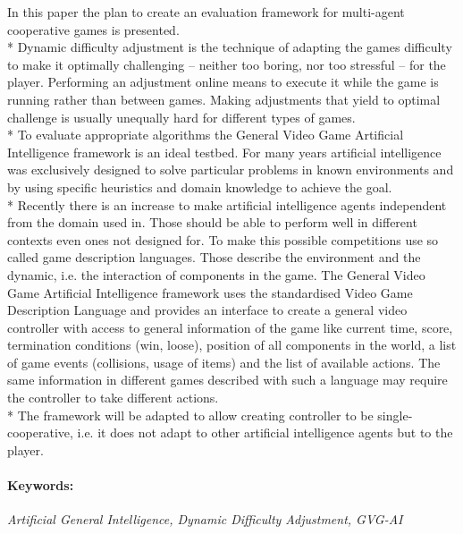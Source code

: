 In this paper the plan to create an evaluation framework for multi-agent cooperative games is presented.\\*
Dynamic difficulty adjustment is the technique of adapting the games difficulty to make it optimally challenging -- neither too boring, nor too stressful -- for the player. Performing an adjustment online means to execute it while the game is running rather than between games. Making adjustments that yield to optimal challenge is usually unequally hard for different types of games.\\*
To evaluate appropriate algorithms the General Video Game Artificial Intelligence framework is an ideal testbed. For many years artificial intelligence was exclusively designed to solve particular problems in known environments and by using specific heuristics and domain knowledge to achieve the goal.\\*
Recently there is an increase to make artificial intelligence agents independent from the domain used in. Those should be able to perform well in different contexts even ones not designed for. To make this possible competitions use so called game description languages. Those describe the environment and the dynamic, i.e. the interaction of components in the game. The General Video Game Artificial Intelligence framework uses the standardised Video Game Description Language  and provides an interface to create a general video controller with access to general information of the game like current time, score, termination conditions (win, loose), position of all components in the world, a list of game events (collisions, usage of items) and the list of available actions. The same information in different games described with such a language may require the controller to take different actions.\\*
The framework will be adapted to allow creating controller to be single-cooperative, i.e. it does not adapt to other artificial intelligence agents but to the player.

\paragraph{Keywords:}
\textit{Artificial General Intelligence, Dynamic Difficulty Adjustment, GVG-AI}